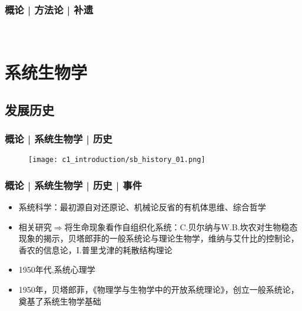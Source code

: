 \begin{frame}
  \frametitle{概论 | 方法论 | 补遗}
  \begin{figure}
    \centering
    \qquad
    \\
    \vspace{1em}
  \end{figure}
\end{frame}

\section{系统生物学}
\subsection{发展历史}
\begin{frame}
  \frametitle{概论 | 系统生物学 | 历史}
  \begin{figure}
    \centering
    \texttt{[image: c1\_introduction/sb\_history\_01.png]}
  \end{figure}
\end{frame}

\begin{frame}
  \frametitle{概论 | 系统生物学 | 历史 | 事件}
  \begin{itemize}
    \item 系统科学：最初源自对还原论、机械论反省的有机体思维、综合哲学
    \item 相关研究$\Rightarrow$将生命现象看作自组织化系统：C.贝尔纳与W.B.坎农对生物稳态现象的揭示，贝塔郎菲的一般系统论与理论生物学，维纳与艾什比的控制论，香农的信息论，I.普里戈津的耗散结构理论
    \item 1950年代,系统心理学
    \item 1950年，贝塔郎菲，《物理学与生物学中的开放系统理论》，创立一般系统论，奠基了系统生物学基础
  \end{itemize}
\end{frame}

